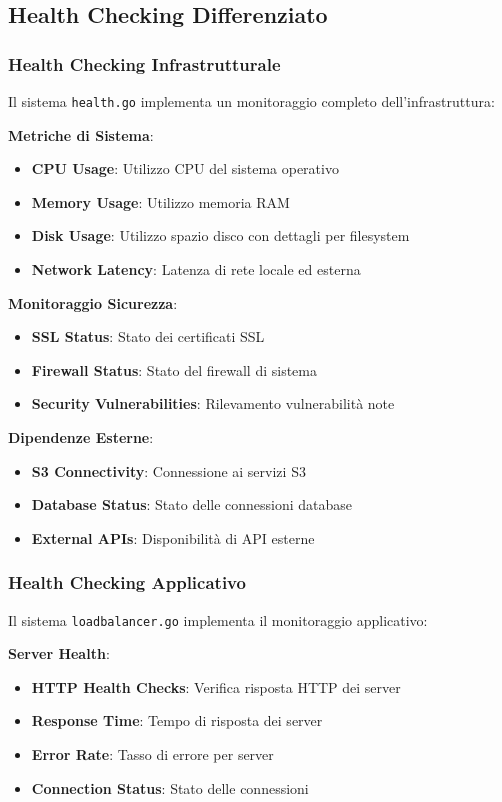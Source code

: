 \documentclass[12pt,a4paper]{article}
\begin{document}
\subsection{Health Checking Differenziato}

\subsubsection{Health Checking Infrastrutturale}

Il sistema \texttt{health.go} implementa un monitoraggio completo dell'infrastruttura:

\textbf{Metriche di Sistema}:
\begin{itemize}
\item \textbf{CPU Usage}: Utilizzo CPU del sistema operativo
\item \textbf{Memory Usage}: Utilizzo memoria RAM
\item \textbf{Disk Usage}: Utilizzo spazio disco con dettagli per filesystem
\item \textbf{Network Latency}: Latenza di rete locale ed esterna
\end{itemize}

\textbf{Monitoraggio Sicurezza}:
\begin{itemize}
\item \textbf{SSL Status}: Stato dei certificati SSL
\item \textbf{Firewall Status}: Stato del firewall di sistema
\item \textbf{Security Vulnerabilities}: Rilevamento vulnerabilità note
\end{itemize}

\textbf{Dipendenze Esterne}:
\begin{itemize}
\item \textbf{S3 Connectivity}: Connessione ai servizi S3
\item \textbf{Database Status}: Stato delle connessioni database
\item \textbf{External APIs}: Disponibilità di API esterne
\end{itemize}

\subsubsection{Health Checking Applicativo}

Il sistema \texttt{loadbalancer.go} implementa il monitoraggio applicativo:

\textbf{Server Health}:
\begin{itemize}
\item \textbf{HTTP Health Checks}: Verifica risposta HTTP dei server
\item \textbf{Response Time}: Tempo di risposta dei server
\item \textbf{Error Rate}: Tasso di errore per server
\item \textbf{Connection Status}: Stato delle connessioni
\end{itemize}
\end{document}
